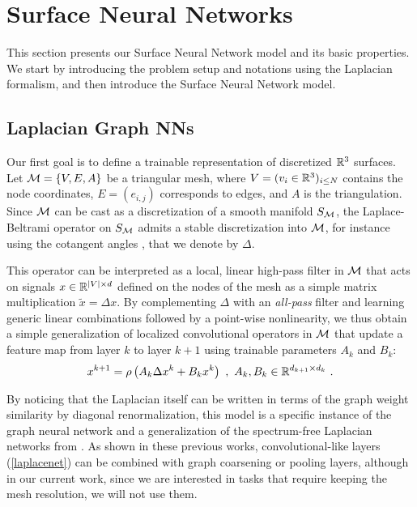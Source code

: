 \section{Surface Neural Networks}
\label{snnsec}

This section presents our Surface Neural Network model
and its basic properties. We start by introducing the 
problem setup and notations using the Laplacian formalism, 
and then introduce the Surface Neural Network model.

\subsection{Laplacian Graph NNs}

Our first goal is to define a trainable representation of 
discretized ${\mathbb{R}}^3$ surfaces. Let ${\mathcal{M}}=\{V,E,A\}$ be a triangular 
mesh, where $V=(v_i \in {\mathbb{R}}^3)_{i \leq N}$ contains the node coordinates, 
$E = (e_{i,j} )$ corresponds to edges, and $A$ is the triangulation. 
Since ${\mathcal{M}}$ can be cast as a discretization of a smooth manifold $S_{{\mathcal{M}}}$, 
the Laplace-Beltrami operator on $S_{{\mathcal{M}}}$ admits a stable discretization 
into ${\mathcal{M}}$, for instance using the cotangent angles \cite{gnnreview}, that we
denote by $\Delta$. 

This operator can be interpreted as a local, linear high-pass filter in ${\mathcal{M}}$ 
that acts on signals $x \in {\mathbb{R}}^{|V| \times d}$ defined on the nodes of the mesh 
as a simple matrix multiplication $\tilde{x} = \Delta x$.
By complementing $\Delta$ with an \emph{all-pass} filter and learning generic 
linear combinations followed by a point-wise nonlinearity, we thus obtain 
a simple generalization of localized convolutional operators in ${\mathcal{M}}$ 
that update a feature map from layer $k$ to layer $k+1$ using trainable parameters $A_k$ and $B_k$:
\begin{equation}
\label{laplacenet}
x^{k+1} = \rho \left( A_k \Delta x^k + B_k x^k \right)~,~A_k,B_k \in {\mathbb{R}}^{d_{k+1} \times d_k} ~.
\end{equation}

By noticing that the Laplacian itself can be written in terms of the graph weight similarity 
by diagonal renormalization, this model is a specific instance of the graph neural network \cite{gnn1, gnnreview, kipf} 
and a generalization of the spectrum-free Laplacian networks from \cite{deferrand}. 
As shown in these previous works, convolutional-like layers (\ref{laplacenet}) can be 
combined with graph coarsening or pooling layers, although in our current work, since 
we are interested in tasks that require keeping the mesh resolution, we will not use them. 

